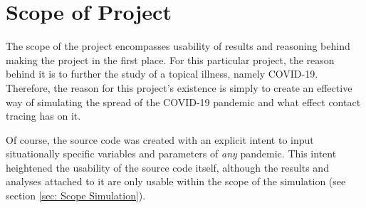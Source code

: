 \section{Scope of Project} \label{sec: Scope project}

The scope of the project encompasses usability of results and reasoning behind making the project in the first place. For this particular project, the reason behind it is to further the study of a topical illness, namely COVID-19. Therefore, the reason for this project's existence is simply to create an effective way of simulating the spread of the COVID-19 pandemic and what effect contact tracing has on it.

Of course, the source code was created with an explicit intent to input situationally specific variables and parameters of \textit{any} pandemic. This intent heightened the usability of the source code itself, although the results and analyses attached to it are only usable within the scope of the simulation (see section \ref{sec: Scope Simulation}).

